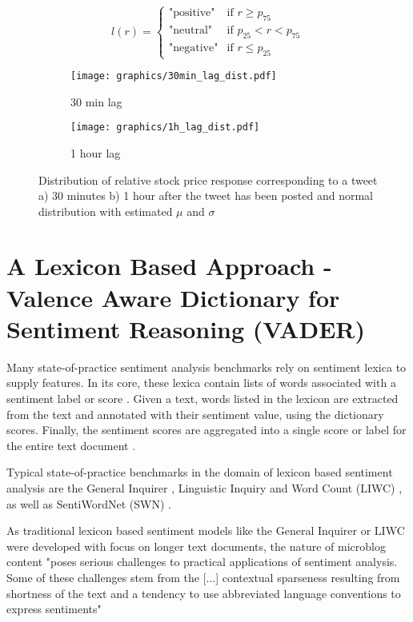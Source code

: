 \documentclass[a4paper,12pt]{article}%
\begin{document}
$$ 
 l(r) =
   \begin{cases}
     \text{"positive"} & \text{if } r \geq p_{75}\\
     \text{"neutral"}  & \text{if }  p_{25} < r < p_{75} \\
     \text{"negative"}  & \text{if } r \leq p_{25}
   \end{cases}
$$




\begin{figure}
\captionsetup{justification=centering}
 \begin{subfigure}[b]{0.5\textwidth}
        \centering
        \texttt{[image: graphics/30min\_lag\_dist.pdf]}
        \caption{30 min lag}
   \end{subfigure}
 \begin{subfigure}[b]{0.5\textwidth}
        \centering
        \texttt{[image: graphics/1h\_lag\_dist.pdf]}
        \caption{1 hour lag}
   \end{subfigure}
\caption{Distribution of relative stock price response corresponding to a tweet a) 30 minutes b) 1 hour after the tweet has been posted and normal distribution with estimated $\mu$ and $\sigma$  \label{fig:lags_hist}}
\end{figure}



\section{A Lexicon Based Approach - Valence Aware Dictionary for Sentiment Reasoning (VADER) \label{lexion-approach}}
Many state-of-practice sentiment analysis benchmarks rely on sentiment lexica to supply features. In its core, these lexica contain lists of words associated with a sentiment label or score . Given a text, words listed in the lexicon are extracted from the text and annotated with their sentiment value, using the dictionary scores. Finally, the sentiment scores are aggregated into a single score or label for the entire text document \citep{Taboada2011}.

Typical state-of-practice benchmarks in the domain of lexicon based sentiment analysis are the General Inquirer \citep{Stone1966}, Linguistic Inquiry and Word Count (LIWC) \citep{Pennebaker2001, Pennebaker2007}, as well as SentiWordNet (SWN) \citep{Baccianella2010}.

As traditional lexicon based sentiment models like the General Inquirer or LIWC were developed with focus on longer text documents, the nature of microblog content "poses serious challenges to practical applications of sentiment analysis. Some of these challenges stem from the [...] contextual sparseness resulting from shortness of the text and a tendency to use abbreviated language conventions to express sentiments" \citep{Hutto2014}
\end{document}
